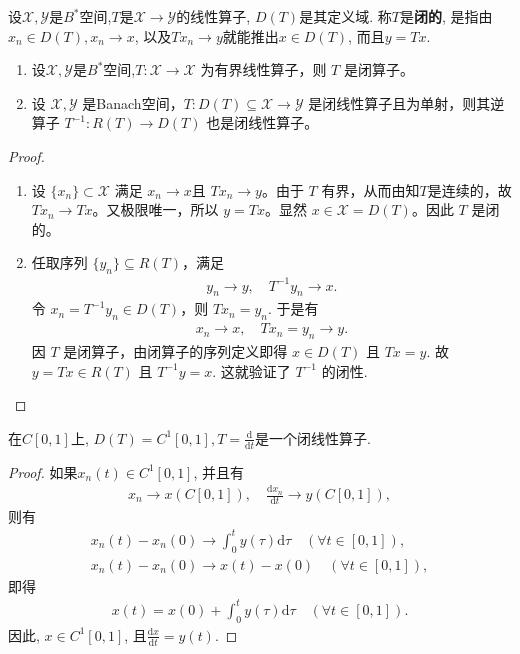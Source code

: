 \documentclass[../../main.tex]{subfiles}%
\begin{document}
\begin{definition}
设$\mathscr{X},\mathscr{Y}$是$B^*$空间,$T$是$\mathscr{X}\to\mathscr{Y}$的线性算子, $D(T)$是其定义域. 称$T$是\textbf{闭的}, 是指由$x_n\in D(T),x_n\to x$, 以及$Tx_n\to y$就能推出$x\in D(T)$, 而且$y=Tx$.
\end{definition}

\begin{proposition}\label{proposition:有界线性算子必是闭的}
\begin{enumerate}[(1)]
\item 设$\mathscr{X},\mathscr{Y}$是$B^*$空间,$T: \mathscr{X} \to  \mathscr{X}$ 为有界线性算子，则 $T$ 是闭算子。

\item 设 $\mathscr{X},\mathscr{Y}$ 是Banach空间，$T:D(T)\subseteq\mathscr{X}\to\mathscr{Y}$ 是闭线性算子且为单射，则其逆算子 $T^{-1}:R(T)\to D(T)$ 也是闭线性算子。
\end{enumerate}
\end{proposition}
\begin{proof}
\begin{enumerate}[(1)]
\item 设 $\{x_n\} \subset \mathscr{X}$ 满足 $x_n \to x$且 $Tx_n \to y$。由于 $T$ 有界，从而由知$T$是连续的，故 $Tx_n \to Tx$。又极限唯一，所以 $y = Tx$。显然 $x \in \mathscr{X} = D(T)$。因此 $T$ 是闭的。

\item 任取序列 $\{y_n\}\subseteq R(T)$，满足
\begin{align*}
y_n\to y ,\quad T^{-1}y_n\to x.
\end{align*}
令 $x_n=T^{-1}y_n\in D(T)$，则 $Tx_n=y_n$. 于是有
\begin{align*}
x_n\to x,\quad Tx_n=y_n\to y.
\end{align*}
因 $T$ 是闭算子，由闭算子的序列定义即得 $x\in D(T)$ 且 $Tx=y$. 故 $y=Tx\in R(T)$ 且 $T^{-1}y=x$. 这就验证了 $T^{-1}$ 的闭性.
\end{enumerate}
\end{proof}

\begin{examples}
在$C[0,1]$上, $D(T)=C^1[0,1], T=\frac{\mathrm{d}}{\mathrm{d}t}$是一个闭线性算子.
\end{examples}
\begin{proof}
如果$x_n(t)\in C^1[0,1]$, 并且有
\begin{align*}
x_n\to x(C[0,1]),\quad \frac{\mathrm{d}x_n}{\mathrm{d}t}\to y(C[0,1]),
\end{align*}
则有
\begin{align*}
x_n(t)-x_n(0)\to\int_{0}^{t}y(\tau)\mathrm{d}\tau\quad(\forall t\in[0,1]),\\
x_n(t)-x_n(0)\to x(t)-x(0)\quad(\forall t\in[0,1]),
\end{align*}
即得
\begin{align*}
x(t)=x(0)+\int_{0}^{t}y(\tau)\mathrm{d}\tau\quad(\forall t\in[0,1]).
\end{align*}
因此, $x\in C^1[0,1]$, 且$\frac{\mathrm{d}x}{\mathrm{d}t}=y(t)$.
\end{proof}
\end{document}
